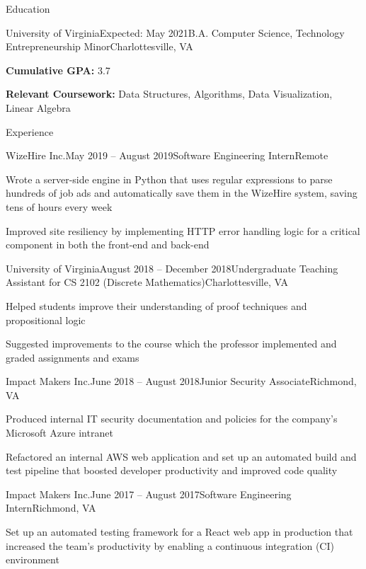 \documentclass{resume}
\begin{document}
\vspace{-1em}
\begin{rSection}{Education}

  \begin{rSubsection}{University of Virginia}{Expected: May 2021}{B.A. Computer Science, Technology Entrepreneurship Minor}{Charlottesville, VA}
    \item \textbf{Cumulative GPA:} 3.7
    \item \textbf{Relevant Coursework:} Data Structures, Algorithms, Data Visualization, Linear Algebra
  \end{rSubsection}

\end{rSection}

\begin{rSection}{Experience}

  \begin{rSubsection}{WizeHire Inc.}{May 2019 -- August 2019}{Software Engineering Intern}{Remote}
    \item Wrote a server-side engine in Python that uses regular expressions to parse hundreds of job ads and automatically save them in the WizeHire system, saving tens of hours every week
    \item Improved site resiliency by implementing HTTP error handling logic for a critical component in both the front-end and back-end
  \end{rSubsection}

  \begin{rSubsection}{University of Virginia}{August 2018 -- December 2018}{Undergraduate Teaching Assistant for CS 2102 (Discrete Mathematics)}{Charlottesville, VA}
    \item Helped students improve their understanding of proof techniques and propositional logic
    \item Suggested improvements to the course which the professor implemented and graded assignments and exams
  \end{rSubsection}

  \begin{rSubsection}{Impact Makers Inc.}{June 2018 -- August 2018}{Junior Security Associate}{Richmond, VA}
    \item Produced internal IT security documentation and policies for the company's Microsoft Azure intranet
    \item Refactored an internal AWS web application and set up an automated build and test pipeline that boosted developer productivity and improved code quality
  \end{rSubsection}

  \begin{rSubsection}{Impact Makers Inc.}{June 2017 -- August 2017}{Software Engineering Intern}{Richmond, VA}
    \item Set up an automated testing framework for a React web app in production that increased the team's productivity by enabling a continuous integration (CI) environment
  \end{rSubsection}

\end{rSection}
\end{document}
